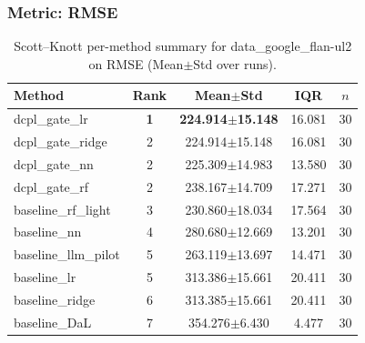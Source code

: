 \subsubsection*{Metric: RMSE}
\begin{table}[H]
\centering
\scriptsize
\setlength{\tabcolsep}{4pt}
\renewcommand{\arraystretch}{1.1}
\caption{Scott--Knott per-method summary for data\_google\_flan-ul2 on RMSE (Mean$\pm$Std over runs).}
\label{tab:sk_data_google_flan-ul2_RMSE}
\begin{tabular}{l|c|c|c|c}
\hline
\textbf{Method} & \textbf{Rank} & \textbf{Mean$\pm$Std} & \textbf{IQR} & \textbf{$n$} \\
\hline
\rowcolor{red!15} dcpl\_gate\_lr & \textbf{1} & \textbf{224.914$\pm$15.148} & 16.081 & 30 \\
dcpl\_gate\_ridge & 2 & 224.914$\pm$15.148 & 16.081 & 30 \\
dcpl\_gate\_nn & 2 & 225.309$\pm$14.983 & 13.580 & 30 \\
dcpl\_gate\_rf & 2 & 238.167$\pm$14.709 & 17.271 & 30 \\
baseline\_rf\_light & 3 & 230.860$\pm$18.034 & 17.564 & 30 \\
baseline\_nn & 4 & 280.680$\pm$12.669 & 13.201 & 30 \\
baseline\_llm\_pilot & 5 & 263.119$\pm$13.697 & 14.471 & 30 \\
baseline\_lr & 5 & 313.386$\pm$15.661 & 20.411 & 30 \\
baseline\_ridge & 6 & 313.385$\pm$15.661 & 20.411 & 30 \\
baseline\_DaL & 7 & 354.276$\pm$6.430 & 4.477 & 30 \\
\hline
\end{tabular}
\end{table}

